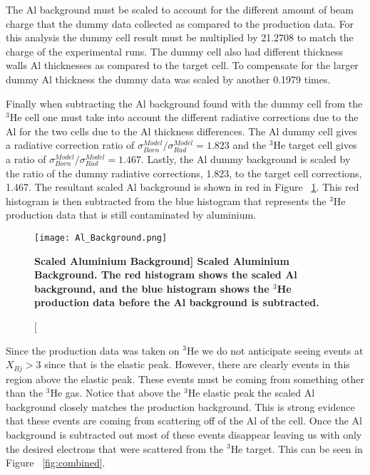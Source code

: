 The Al background must be scaled to account for the different amount of beam charge that the dummy data collected as compared to the production data. For this analysis the dummy cell result must be multiplied by 21.2708 to match the charge of the experimental runs. The dummy cell also had different thickness walls Al thicknesses as compared to the target cell. To compensate for the larger dummy Al thickness the dummy data was scaled by another 0.1979 times.

Finally when subtracting the Al background found with the dummy cell from the $^3$He cell one must take into account the different radiative corrections due to the Al for the two cells due to the Al thickness differences. The Al dummy cell gives a radiative correction ratio of $\sigma^{Model}_{Born}/\sigma^{Model}_{Rad} = 1.823$ and the $^3$He target cell gives a ratio of $\sigma^{Model}_{Born}/\sigma^{Model}_{Rad} = 1.467$. Lastly, the Al dummy background is scaled by the ratio of the dummy radiative corrections, 1.823, to the target cell corrections, 1.467. The resultant scaled Al background is shown in red in Figure ~\ref{fig:al}. This red histogram is then subtracted from the blue histogram that represents the $^3$He production data that is still contaminated by aluminium. 

\begin{figure}[!ht]
\begin{center}
\texttt{[image: Al\_Background.png]}
\end{center}
\caption[\bf{Scaled Aluminium Background}]{
{\bf{Scaled Aluminium Background.}} The red histogram shows the scaled Al background, and the blue histogram shows the $^3$He production data before the Al background is subtracted.}
\label{fig:al}
\end{figure}

Since the production data was taken on $^3$He we do not anticipate seeing events at $X_{Bj} > 3$ since that is the elastic peak. However, there are clearly events in this region above the elastic peak. These events must be coming from something other than the $^3$He gas. Notice that above the $^3$He elastic peak the scaled Al background closely matches the production background. This is strong evidence that these events are coming from scattering off of the Al of the cell. Once the Al background is subtracted out most of these events disappear leaving us with only the desired electrons that were scattered from the $^3$He target. This can be seen in Figure ~\ref{fig:combined}.

